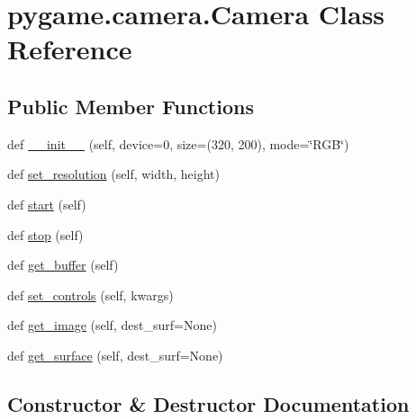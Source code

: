 \hypertarget{classpygame_1_1camera_1_1_camera}{}\section{pygame.\+camera.\+Camera Class Reference}
\label{classpygame_1_1camera_1_1_camera}
\subsection*{Public Member Functions}
\begin{DoxyCompactItemize}
\item 
def \hyperlink{classpygame_1_1camera_1_1_camera_ac77bbb04a335eb231bdd028616be0469}{\+\_\+\+\_\+init\+\_\+\+\_\+} (self, device=0, size=(320, 200), mode=\char`\"{}R\+GB\char`\"{})
\item 
def \hyperlink{classpygame_1_1camera_1_1_camera_a3db8b281a94e723d5eae7bc41aa66466}{set\+\_\+resolution} (self, width, height)
\item 
def \hyperlink{classpygame_1_1camera_1_1_camera_a845e1c713117a78978e2d9d39282a1e8}{start} (self)
\item 
def \hyperlink{classpygame_1_1camera_1_1_camera_a4fb847d8e2b5a3f34d936b0b9c048a23}{stop} (self)
\item 
def \hyperlink{classpygame_1_1camera_1_1_camera_a8e3a1948f3990f5e60faaaf951874484}{get\+\_\+buffer} (self)
\item 
def \hyperlink{classpygame_1_1camera_1_1_camera_aed09222cf4316a1464c1c512973ee2b9}{set\+\_\+controls} (self, kwargs)
\item 
def \hyperlink{classpygame_1_1camera_1_1_camera_a76e94c007b2a78249688209c31cacd42}{get\+\_\+image} (self, dest\+\_\+surf=None)
\item 
def \hyperlink{classpygame_1_1camera_1_1_camera_acabc6e909c4f0aded8479424d204427b}{get\+\_\+surface} (self, dest\+\_\+surf=None)
\end{DoxyCompactItemize}


\subsection{Constructor \& Destructor Documentation}
\mbox{\label{classpygame_1_1camera_1_1_camera_ac77bbb04a335eb231bdd028616be0469}} 
